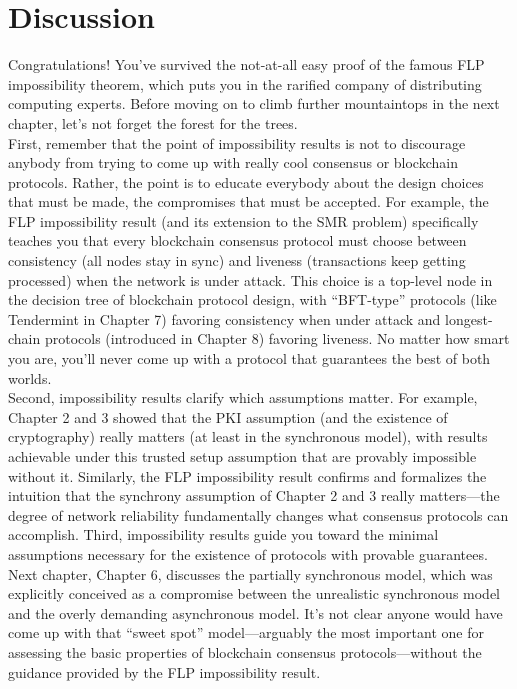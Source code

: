 \section{Discussion}
Congratulations! You've survived the not-at-all easy proof of the famous FLP impossibility
theorem, which puts you in the rarified company of distributing computing experts. Before
moving on to climb further mountaintops in the next chapter, let’s not forget the forest for
the trees.\\
First, remember that the point of impossibility results is not to discourage anybody from
trying to come up with really cool consensus or blockchain protocols. Rather, the point is
to educate everybody about the design choices that must be made, the compromises that
must be accepted. For example, the FLP impossibility result (and its extension to the SMR
problem) specifically teaches you that every blockchain consensus protocol
must choose between consistency (all nodes stay in sync) and liveness (transactions keep
getting processed) when the network is under attack. This choice is a top-level node in the
decision tree of blockchain protocol design, with “BFT-type” protocols (like Tendermint in
Chapter 7) favoring consistency when under attack and longest-chain protocols (introduced
in Chapter 8) favoring liveness. No matter how smart you are, you’ll never come up with a
protocol that guarantees the best of both worlds.\\
Second, impossibility results clarify which assumptions matter. For example, Chapter 2
and 3 showed that the PKI assumption (and the existence of cryptography) really matters
(at least in the synchronous model), with results achievable under this trusted setup assumption that are provably impossible without it. Similarly, the FLP impossibility result confirms and formalizes the intuition that the synchrony assumption of Chapter 2 and 3
really matters—the degree of network reliability fundamentally changes what consensus protocols can accomplish.
Third, impossibility results guide you toward the minimal assumptions necessary for
the existence of protocols with provable guarantees. Next chapter, Chapter 6, discusses the
partially synchronous model, which was explicitly conceived as a compromise between the
unrealistic synchronous model and the overly demanding asynchronous model. It’s not clear
anyone would have come up with that “sweet spot” model—arguably the most important one
for assessing the basic properties of blockchain consensus protocols—without the guidance
provided by the FLP impossibility result.\\
